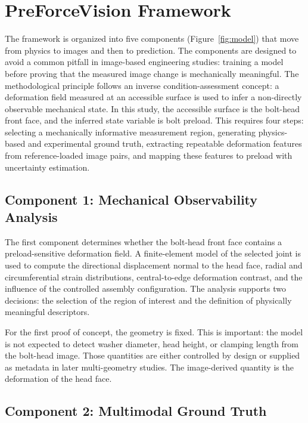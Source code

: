 \section{PreForceVision Framework}

The framework is organized into five components (Figure~\ref{fig:model}) that move from physics to images and then to prediction. The components are designed to avoid a common pitfall in image-based engineering studies: training a model before proving that the measured image change is mechanically meaningful.
The methodological principle follows an inverse condition-assessment concept: a deformation field measured at an accessible surface is used to infer a non-directly observable mechanical state. In this study, the accessible surface is the bolt-head front face, and the inferred state variable is bolt preload. This requires four steps: selecting a mechanically informative measurement region, generating physics-based and experimental ground truth, extracting repeatable deformation features from reference-loaded image pairs, and mapping these features to preload with uncertainty estimation.

\subsection{Component 1: Mechanical Observability Analysis}
The first component determines whether the bolt-head front face contains a preload-sensitive deformation field. A finite-element model of the selected joint is used to compute the directional displacement normal to the head face, radial and circumferential strain distributions, central-to-edge deformation contrast, and the influence of the controlled assembly configuration. The analysis supports two decisions: the selection of the region of interest and the definition of physically meaningful descriptors.

For the first proof of concept, the geometry is fixed. This is important: the model is not expected to detect washer diameter, head height, or clamping length from the bolt-head image. Those quantities are either controlled by design or supplied as metadata in later multi-geometry studies. The image-derived quantity is the deformation of the head face.

\subsection{Component 2: Multimodal Ground Truth}


